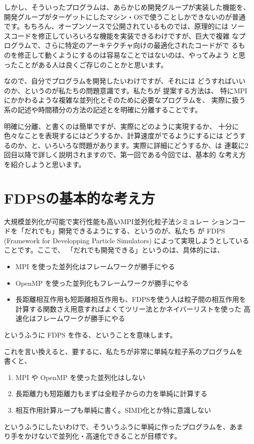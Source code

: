 \documentclass[twocolumn,10pt]{jarticle}
\begin{document}
しかし、そういったプログラムは、あらかじめ開発グループが実装した機能を、
開発グループがターゲットにしたマシン・OSで使うことしかできないのが普通
です。もちろん、オープンソースで公開されているものでは、原理的には
ソースコードを修正していろいろな機能を実装できるわけですが、巨大で複雑
なプログラムで、さらに特定のアーキテクチャ向けの最適化されたコードがで
るものを修正して動くようにするのは容易なことではないのは、やってみよう
と思ったことがある人は良くご存じのことかと思います。

なので、自分でプログラムを開発したいわけですが、それには
どうすればいいのか、というのが私たちの問題意識です。私たちが
提案する方法は、
特にMPIにかかわるような複雑な並列化とそのために必要なプログラムを、
実際に扱う系の記述や時間積分の方法の記述とを明確に分離することです。

明確に分離、と書くのは簡単ですが、実際にどのように実現するか、
十分に色々なことを表現するにはどうするか、計算速度がでるようにするには
どうするのか、と、いろいろな問題があります。実際に詳細にどうするか、は
連載に2回目以降で詳しく説明されますので、第一回である今回では、基本的
な考え方を紹介しようと思います。

\section{FDPSの基本的な考え方}

大規模並列化が可能で実行性能も高いMPI並列化粒子法シミュレー
ションコードを「だれでも」開発できるようにする、というのが、私たち
が FDPS (Framework for Developping Particle
Simulators) によって実現しようとしていることです。ここで、
「だれでも開発できる」というのは、具体的には、

\begin{itemize}

\item MPI を使った並列化はフレームワークが勝手にやる
\item OpenMP を使った並列化もフレームワークが勝手にやる
\item 長距離相互作用も短距離相互作用も、FDPSを使う人は粒子間の相互作用を
  計算する関数さえ用意すればよくてツリー法とかネイバーリストを使った
  高速化はフレームワークが勝手にやる

\end{itemize}
というふうに FDPS を作る、ということを意味します。

これを言い換えると、要するに、私たちが非常に単純な粒子系のプログラムを
書くと、

\begin{enumerate}

\item MPI や OpenMP を使った並列化はしない
\item 長距離力も短距離力もまずは全粒子からの力を単純に計算する
\item 相互作用計算ループも単純に書く。SIMD化とか特に意識しない

\end{enumerate}
というふうにしたいわけで、そういうふうに単純に作ったプログラムを、あま
り手をかけないで並列化・高速化できることが目標です。
\end{document}
